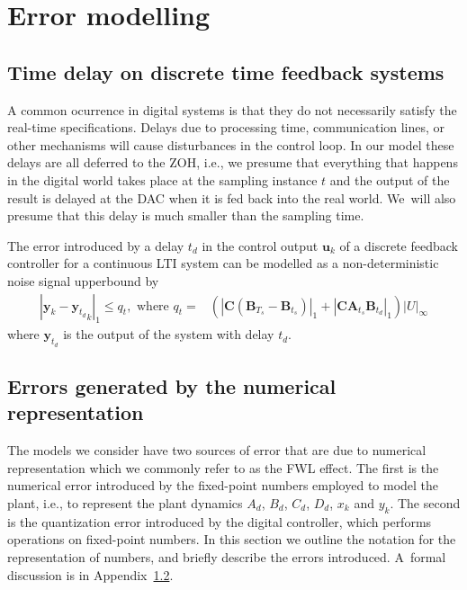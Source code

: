 \documentclass[sigconf]{llncs}
\newcommand{\mat}[1]{\boldsymbol{#1}}
\renewcommand{\vec}[1]{\boldsymbol{#1}}
\begin{document}
\section{Error modelling}\label{sec:errors}

\subsection{Time delay on discrete time feedback systems} \label{sec:delay}
A common ocurrence in digital systems is that they do not necessarily
satisfy the real-time specifications.  Delays due to processing time,
communication lines, or other mechanisms will cause disturbances in the
control loop.  In our model these delays are all deferred to the ZOH, i.e.,
we presume that everything that happens in the digital world takes place at
the sampling instance $t$ and the output of the result is delayed at the DAC
when it is fed back into the real world.  We~will also presume that this
delay is much smaller than the sampling time.

\begin{theorem}
The error introduced by a delay $t_d$ in the control output $\vec{u}_k$ of a discrete feedback controller for a continuous LTI system can be modelled as a non-deterministic noise signal upperbound by 
\begin{align}
|\vec{y}_{k}-{\vec{y}_{t_d}}_{k}|_1 \leq q_t, \text{ where } q_t=&(|\mat{C}(\mat{B}_{T_s}-\mat{B}_{t_s})|_1+|\mat{C}\mat{A}_{t_s}\mat{B}_{t_d}|_1)|U|_\infty
\end{align}
where $\vec{y}_{t_d}$ is the output of the system with delay $t_d$.
\end{theorem}
%
%
\subsection{Errors generated by the numerical representation} 
\label{sec:numeric_rep}

The models we consider have two sources of error that are due to numerical  
representation which we commonly refer to as the FWL effect.
The first is the numerical error introduced by the
fixed-point numbers employed to model the plant, i.e., to represent the
plant dynamics $A_d$, $B_d$, $C_d$, $D_d$, $x_k$ and $y_k$.
The second is the quantization error
introduced by the digital controller, which performs operations on
fixed-point numbers.  In this section we outline the notation for the
representation of numbers, and briefly describe the errors
introduced.  A~formal discussion is in
Appendix~\ref{sec:numeric_rep}.
\end{document}
